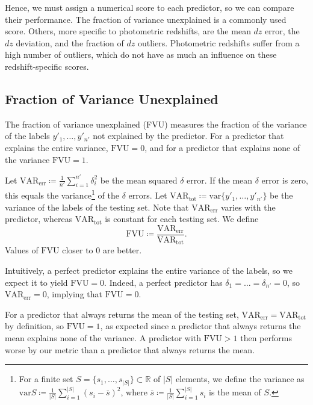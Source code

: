 \documentclass[11pt,twoside]{report}
\newcommand\bbR{\mathbb{R}}
\newcommand\var{\mathrm{var}}
\newcommand\abs[1]{\left|#1\right|}
\begin{document}
Hence, we must assign a numerical score to each predictor, so we can compare their performance. The fraction of variance unexplained is a commonly used score. Others, more specific to photometric redshifts, are the mean $dz$ error, the $dz$ deviation, and the fraction of $dz$ outliers. Photometric redshifts suffer from a high number of outliers, which do not have as much an influence on these redshift-specific scores.

\subsection{Fraction of Variance Unexplained}
The fraction of variance unexplained (FVU) measures the fraction of the variance of the labels $y'_1, \dots, y'_{n'}$ not explained by the predictor. For a predictor that explains the entire variance, $\mathrm{FVU}=0$, and for a predictor that explains none of the variance $\mathrm{FVU}=1$.

Let $\mathrm{VAR_{err}} \coloneqq \frac{1}{n'}\sum_{i=1}^{n'}\delta_i^2$ be the mean squared $\delta$ error. If the mean $\delta$ error is zero, this equals the variance\footnote{For a finite set $S = \{s_1, \dots, s_{\abs{S}}\} \subset \bbR$ of $\abs{S}$ elements, we define the variance as $\var S \coloneqq \frac1{\abs{S}}\sum_{i=1}^{\abs{S}}(s_i - \overline{s})^2$, where $\overline{s} \coloneqq \frac1{\abs{S}}\sum_{i=1}^{\abs{S}}s_i$ is the mean of $S$.} of the $\delta$ errors. Let $\mathrm{VAR_{tot}} \coloneqq \var\{y'_1, \dots, y'_{n'}\}$ be the variance of the labels of the testing set. Note that $\mathrm{VAR_{err}}$ varies with the predictor, whereas $\mathrm{VAR_{tot}}$ is constant for each testing set. We define \[
  \mathrm{FVU} \coloneqq \frac{\mathrm{VAR_{err}}}{\mathrm{VAR_{tot}}} \text{.}
\]  Values of $\mathrm{FVU}$ closer to $0$ are better.

Intuitively, a perfect predictor explains the entire variance of the labels, so we expect it to yield $\mathrm{FVU} = 0$. Indeed, a perfect predictor has $\delta_1 = \dots = \delta_{n'} = 0$, so $\mathrm{VAR_{err}} = 0$, implying that $\mathrm{FVU} = 0$.

For a predictor that always returns the mean of the testing set, $\mathrm{VAR_{err}} = \mathrm{VAR_{tot}}$ by definition, so $\mathrm{FVU} = 1$, as expected since a predictor that always returns the mean explains none of the variance. A predictor with $\mathrm{FVU} > 1$ then performs worse by our metric than a predictor that always returns the mean.
\end{document}
